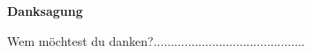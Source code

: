 \newenvironment{acknowledgements}%
    {\cleardoublepage\thispagestyle{empty}\null\vfill\begin{center}%
    \bfseries Danksagung\end{center}}%
    {\vfill\null}
        \begin{acknowledgements}
        Wem möchtest du danken?............................................
        \end{acknowledgements}